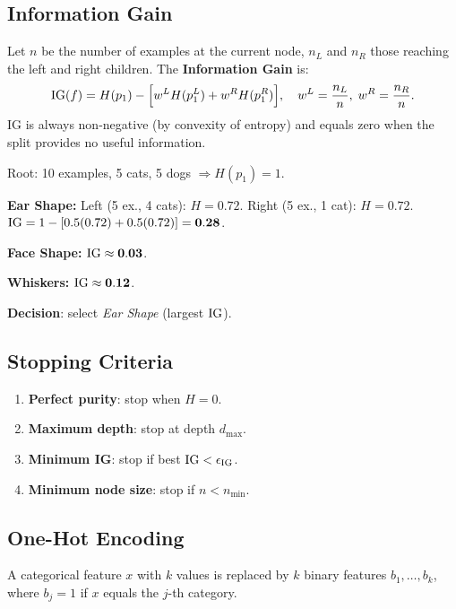 \subsection{Information Gain}
\label{sec:infogain}

Let $n$ be the number of examples at the current node, $n_L$ and $n_R$ those
reaching the left and right children. The \textbf{Information Gain} is:
\begin{equation}
\mathrm{IG}(f)=H(p_1)-\Bigl[w^L H(p_1^L)+w^R H(p_1^R)\Bigr],\quad
w^L=\frac{n_L}{n},\;w^R=\frac{n_R}{n}.
\label{eq:ig}
\end{equation}
IG is always non-negative (by convexity of entropy) and equals zero when the
split provides no useful information.

\begin{example}
Root: 10 examples, 5 cats, 5 dogs $\Rightarrow H(p_1)=1$.

\textbf{Ear Shape:} Left (5 ex., 4 cats): $H=0.72$. Right (5 ex., 1 cat):
$H=0.72$. $\mathrm{IG}=1-[0.5(0.72)+0.5(0.72)]=\mathbf{0.28}$.

\textbf{Face Shape:} $\mathrm{IG}\approx\mathbf{0.03}$.

\textbf{Whiskers:} $\mathrm{IG}\approx\mathbf{0.12}$.

\textbf{Decision}: select \textit{Ear Shape} (largest $\mathrm{IG}$).
\end{example}

\subsection{Stopping Criteria}
\label{sec:stopping}

\begin{enumerate}
\item \textbf{Perfect purity}: stop when $H=0$.
\item \textbf{Maximum depth}: stop at depth $d_{\max}$.
\item \textbf{Minimum IG}: stop if best $\mathrm{IG}<\epsilon_{\mathrm{IG}}$.
\item \textbf{Minimum node size}: stop if $n<n_{\min}$.
\end{enumerate}

\subsection{One-Hot Encoding}
\label{sec:ohe}

\begin{definition}
A categorical feature $x$ with $k$ values is replaced by $k$ binary features
$b_1,\ldots,b_k$, where $b_j=1$ if $x$ equals the $j$-th category.
\end{definition}

